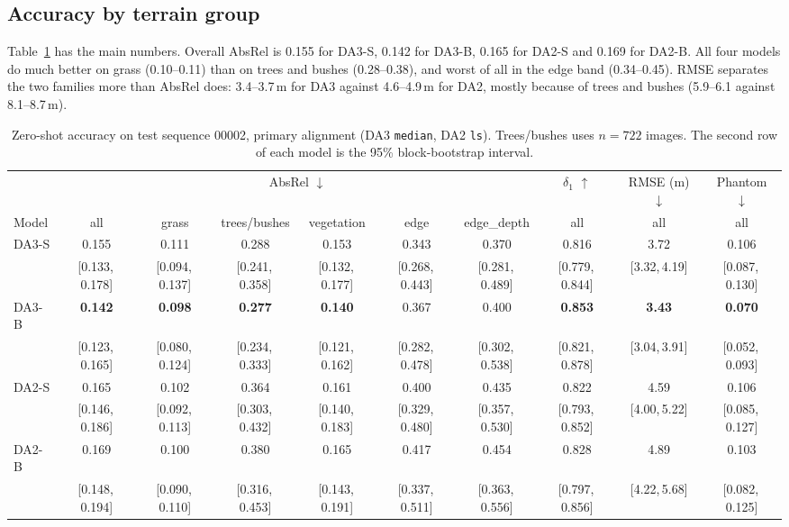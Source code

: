 \documentclass[conference]{IEEEtran}
\newcommand{\ci}[2]{{\scriptsize[#1,\,#2]}}
\newcommand{\absrel}{AbsRel}
\newcommand{\dOne}{$\delta_1$}
\begin{document}
\subsection{Accuracy by terrain group}\label{sec:acc}
Table~\ref{tab:headline} has the main numbers. Overall \absrel{} is 0.155 for DA3-S, 0.142 for DA3-B, 0.165 for DA2-S and 0.169 for DA2-B. All four models do much better on grass (0.10--0.11) than on trees and bushes (0.28--0.38), and worst of all in the edge band (0.34--0.45). RMSE separates the two families more than \absrel{} does: 3.4--3.7\,m for DA3 against 4.6--4.9\,m for DA2, mostly because of trees and bushes (5.9--6.1 against 8.1--8.7\,m).

\begin{table}[!t]
\caption{Zero-shot accuracy on test sequence 00002, primary alignment (DA3 \texttt{median}, DA2 \texttt{ls}). Trees/bushes uses $n{=}722$ images. The second row of each model is the 95\% block-bootstrap interval.}
\label{tab:headline}
\centering
\small
\setlength{\tabcolsep}{5pt}
\begin{tabular}{l ccccccc cc}
\toprule
 & \multicolumn{6}{c}{\absrel{} $\downarrow$} & \dOne{} $\uparrow$ & RMSE (m) $\downarrow$ & Phantom $\downarrow$ \\
\cmidrule(lr){2-7}
Model & all & grass & trees/bushes & vegetation & edge & edge\_depth & all & all & all \\
\midrule
DA3-S & 0.155 & 0.111 & 0.288 & 0.153 & 0.343 & 0.370 & 0.816 & 3.72 & 0.106 \\
 & \ci{0.133}{0.178} & \ci{0.094}{0.137} & \ci{0.241}{0.358} & \ci{0.132}{0.177} & \ci{0.268}{0.443} & \ci{0.281}{0.489} & \ci{0.779}{0.844} & \ci{3.32}{4.19} & \ci{0.087}{0.130} \\
DA3-B & \textbf{0.142} & \textbf{0.098} & \textbf{0.277} & \textbf{0.140} & 0.367 & 0.400 & \textbf{0.853} & \textbf{3.43} & \textbf{0.070} \\
 & \ci{0.123}{0.165} & \ci{0.080}{0.124} & \ci{0.234}{0.333} & \ci{0.121}{0.162} & \ci{0.282}{0.478} & \ci{0.302}{0.538} & \ci{0.821}{0.878} & \ci{3.04}{3.91} & \ci{0.052}{0.093} \\
DA2-S & 0.165 & 0.102 & 0.364 & 0.161 & 0.400 & 0.435 & 0.822 & 4.59 & 0.106 \\
 & \ci{0.146}{0.186} & \ci{0.092}{0.113} & \ci{0.303}{0.432} & \ci{0.140}{0.183} & \ci{0.329}{0.480} & \ci{0.357}{0.530} & \ci{0.793}{0.852} & \ci{4.00}{5.22} & \ci{0.085}{0.127} \\
DA2-B & 0.169 & 0.100 & 0.380 & 0.165 & 0.417 & 0.454 & 0.828 & 4.89 & 0.103 \\
 & \ci{0.148}{0.194} & \ci{0.090}{0.110} & \ci{0.316}{0.453} & \ci{0.143}{0.191} & \ci{0.337}{0.511} & \ci{0.363}{0.556} & \ci{0.797}{0.856} & \ci{4.22}{5.68} & \ci{0.082}{0.125} \\
\bottomrule
\end{tabular}
\end{table}
\end{document}
